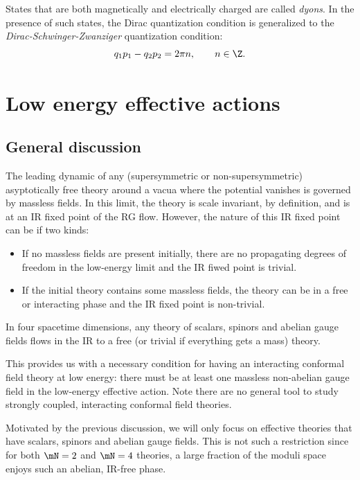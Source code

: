 \documentclass{worksheetclass}
\begin{document}
    States that are both magnetically and electrically charged are called \emph{dyons}. In the presence of such states, the Dirac quantization condition is generalized to the \emph{Dirac-Schwinger-Zwanziger} quantization condition:
    \begin{equation}
        q_1p_1-q_2p_2=2\pi n,\qquad n\in\Z.
    \end{equation}



\section{Low energy effective actions}

    \subsection{General discussion}

        The leading dynamic of any (supersymmetric or non-supersymmetric) asyptotically free theory around a vacua where the potential vanishes is governed by massless fields. In this limit, the theory is scale invariant, by definition, and is at an IR fixed point of the RG flow. However, the nature of this IR fixed point can be if two kinds:
        \begin{itemize}
            \item If no massless fields are present initially, there are no propagating degrees of freedom in the low-energy limit and the IR fiwed point is trivial.
            \item If the initial theory contains some massless fields, the theory can be in a free or interacting phase and the IR fixed point is non-trivial.
        \end{itemize}
        
        \begin{theorem}
            In four spacetime dimensions, any theory of scalars, spinors and abelian gauge fields flows in the IR to a free (or trivial if everything gets a mass) theory.
        \end{theorem}
        This provides us with a necessary condition for having an interacting conformal field theory at low energy: there must be at least one massless non-abelian gauge field in the low-energy effective action. Note there are no general tool to study strongly coupled, interacting conformal field theories.

        Motivated by the previous discussion, we will only focus on effective theories that have scalars, spinors and abelian gauge fields. This is not such a restriction since for both $\mN=2$ and $\mN=4$ theories, a large fraction of the moduli space enjoys such an abelian, IR-free phase.
        
\end{document}
